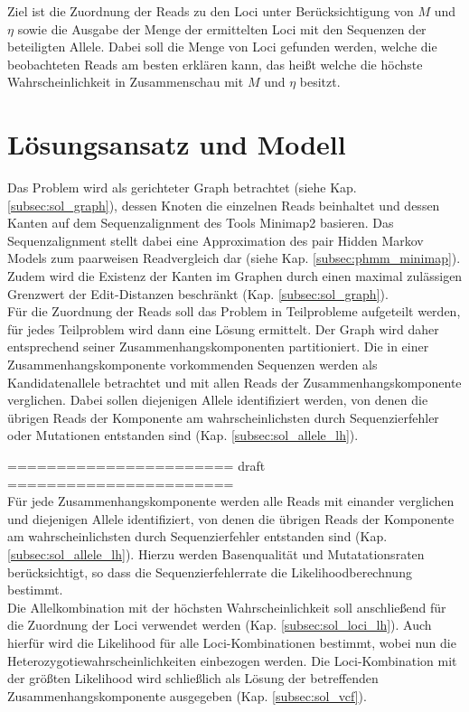 Ziel ist die Zuordnung der Reads zu den Loci unter Berücksichtigung von $M$ und $\eta$ sowie die Ausgabe der Menge der ermittelten Loci mit den Sequenzen der beteiligten Allele. Dabei soll die Menge von Loci gefunden werden, welche die beobachteten Reads am besten erklären kann, das heißt welche die höchste Wahrscheinlichkeit in Zusammenschau mit $M$ und $\eta$ besitzt. \\

\section{Lösungsansatz und Modell} \label{sec:solution}

Das Problem wird als gerichteter Graph betrachtet (siehe Kap. \ref{subsec:sol_graph}), dessen Knoten die einzelnen Reads beinhaltet und dessen Kanten auf dem Sequenzalignment des Tools Minimap2 basieren. Das Sequenzalignment stellt dabei eine Approximation des pair Hidden Markov Models zum paarweisen Readvergleich dar (siehe Kap. \ref{subsec:phmm_minimap}). Zudem wird die Existenz der Kanten im Graphen durch einen maximal zulässigen Grenzwert der Edit-Distanzen beschränkt (Kap. \ref{subsec:sol_graph}). \\

Für die Zuordnung der Reads soll das Problem in Teilprobleme aufgeteilt werden, für jedes Teilproblem wird dann eine Lösung ermittelt. Der Graph wird daher entsprechend seiner Zusammenhangskomponenten partitioniert. Die in einer Zusammenhangskomponente vorkommenden Sequenzen werden als Kandidatenallele betrachtet und mit allen Reads der Zusammenhangskomponente verglichen. Dabei sollen diejenigen Allele identifiziert werden, von denen die übrigen Reads der Komponente am wahrscheinlichsten durch Sequenzierfehler oder Mutationen entstanden sind (Kap. \ref{subsec:sol_allele_lh}). 

\noindent======================= draft =======================\\

Für jede Zusammenhangskomponente werden alle Reads mit einander verglichen und diejenigen Allele identifiziert, von denen die übrigen Reads der Komponente am wahrscheinlichsten durch Sequenzierfehler entstanden sind (Kap. \ref{subsec:sol_allele_lh}). Hierzu werden Basenqualität und Mutatationsraten berücksichtigt, so dass die Sequenzierfehlerrate die Likelihoodberechnung bestimmt. \\

Die Allelkombination mit der höchsten Wahrscheinlichkeit soll anschließend für die Zuordnung der Loci verwendet werden (Kap. \ref{subsec:sol_loci_lh}). Auch hierfür wird die Likelihood für alle Loci-Kombinationen bestimmt, wobei nun die Heterozygotiewahrscheinlichkeiten einbezogen werden. Die Loci-Kombination mit der größten Likelihood wird schließlich als Lösung der betreffenden Zusammenhangskomponente ausgegeben (Kap. \ref{subsec:sol_vcf}).\\

